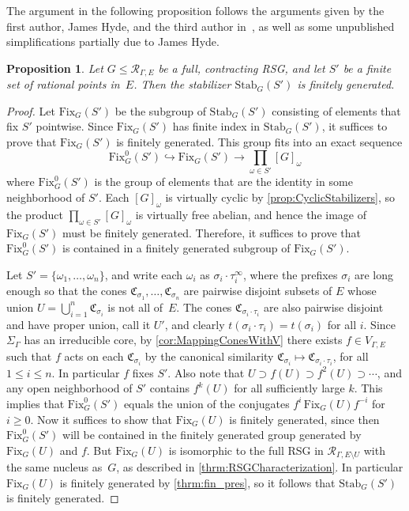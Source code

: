 \documentclass[11pt,letterpaper]{amsart}
\newtheorem{proposition}[theorem]{Proposition}
\theoremstyle{definition}
\newcommand{\R}{\mathcal{R}}
\newcommand{\C}{\mathfrak{C}}
\newcommand{\Fix}{\mathrm{Fix}}
\newcommand{\Stab}{\mathrm{Stab}}
\begin{document}
The argument in the following proposition follows the arguments given by the first author, James Hyde, and the third author in~\cite{BelkHydeMatucciStabs}, as well as some unpublished simplifications partially due to James Hyde.

\begin{proposition}\label{prop:fin_gen_stabs}
Let $G\leq \R_{\Gamma,E}$ be a full, contracting RSG, and let $S'$ be a finite set of rational points in~$E$.  Then the stabilizer\/ $\mathrm{Stab}_G(S')$ is finitely generated.
\end{proposition}
\begin{proof}
Let $\Fix_G(S')$ be the subgroup of $\Stab_G(S')$ consisting of elements that fix $S'$ pointwise.  Since $\Fix_G(S')$ has finite index in $\Stab_G(S')$, it suffices to prove that $\Fix_G(S')$ is finitely generated.  This group fits into an exact sequence
\[
\Fix_G^0(S') \hookrightarrow \Fix_G(S') \to \prod_{\omega\in S'} [G]_\omega
\]
where $\Fix_G^0(S')$ is the group of elements that are the identity in some neighborhood of $S'$.  Each $[G]_\omega$ is virtually cyclic by \cref{prop:CyclicStabilizers}, so the product $\prod_{\omega\in S'} [G]_\omega$ is virtually free abelian, and hence the image of $\Fix_G(S')$ must be finitely generated.  Therefore, it suffices to prove that $\Fix_G^0(S')$ is contained in a finitely generated subgroup of $\Fix_G(S')$.
 
Let $S'=\{\omega_1,\ldots,\omega_n\}$, and write each $\omega_i$ as $\sigma_i\cdot \tau_i^\infty$, where the prefixes $\sigma_i$ are long enough so that the cones $\C_{\sigma_1},\ldots,\C_{\sigma_n}$ are pairwise disjoint subsets of $E$ whose union $U=\bigcup_{i=1}^n \C_{\sigma_i}$ is not all of~$E$.  The cones $\C_{\sigma_i\cdot\tau_i}$ are also pairwise disjoint and have proper union, call it $U'$, and clearly $t(\sigma_i\cdot\tau_i)=t(\sigma_i)$ for all $i$. Since $\Sigma_\Gamma$ has an irreducible core, by \cref{cor:MappingConesWithV} there exists $f\in V_{\Gamma,E}$ such that $f$ acts on each $\C_{\sigma_i}$ by the canonical similarity $\C_{\sigma_i}\mapsto \C_{\sigma_i\cdot\tau_i}$, for all $1\le i\le n$. In particular $f$ fixes $S'$. Also note that $U\supset f(U) \supset f^2(U)\supset\cdots$, and any open neighborhood of $S'$ contains $f^k(U)$ for all sufficiently large $k$. This implies that $\Fix_G^0(S')$ equals the union of the conjugates $f^i\, \Fix_G(U) f^{-i}$ for $i\ge 0$. Now it suffices to show that $\Fix_G(U)$ is finitely generated, since then $\Fix_G^0(S')$ will be contained in the finitely generated group generated by $\Fix_G(U)$ and $f$.  But $\Fix_G(U)$ is isomorphic to the full RSG in $\R_{\Gamma,E\setminus U}$ with the same nucleus as~$G$, as described in \cref{thrm:RSGCharacterization}. In particular $\Fix_G(U)$ is finitely generated by \cref{thrm:fin_pres}, so it follows that $\Stab_G(S')$ is finitely generated.
\end{proof}
\end{document}
